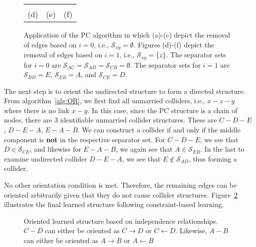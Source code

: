 \documentclass{article}
\begin{document}
\begin{figure}[H]
\begin{tabular}{@{}ccc@{}}
\begin{tikzpicture}[thick,scale=0.8, every node/.style={scale=0.8}]
        \end{tikzpicture}\\ 
        (d) & (e) & (f)
    \end{tabular}
    \caption{Application of the PC algorithm in which (a)-(c) depict the removal of edges based on $i = 0$, i.e., $\mathcal{S}_{xy} = \emptyset$. Figures (d)-(f) depict the removal of edges based on $i = 1$, i.e., $\mathcal{S}_{xy} = \{z\}$. The separator sets for $i = 0$ are $\mathcal{S}_{AC} = \mathcal{S}_{AD} = \mathcal{S}_{CB} = \emptyset$. The separator sets for $i = 1$ are $\mathcal{S}_{BD} = E$, $\mathcal{S}_{EB} = A$, and $\mathcal{S}_{CE} = D$. }
    \label{fig:PC}
\end{figure}

\noindent The next step is to orient the undirected structure to form a directed structure. From algorithm~\ref{alg:OR}, we first find all unmarried colliders, i.e., $x - z - y$ where there is no link $x - y$. In this case, since the PC structure is a chain of nodes, there are 3 identifiable unmarried collider structures. These are $C - D - E$, $D - E - A$, $E - A - B$. We can construct a collider if and only if the middle component is \textbf{not} in the respective separator set. For $C - D - E$, we see that $D \in \mathcal{S}_{CE}$, and likewise for $E - A - B$, we again see that $A \in \mathcal{S}_{EB}$. In the last to examine undirected collider $D - E - A$, we see that $E \notin \mathcal{S}_{AD}$, thus forming a collider. 

No other orientation condition is met. Therefore, the remaining edges can be oriented arbitrarily given that they do not cause collider structures. Figure~\ref{fig:PC2} illustrates the final learned structure following constraint-based learning. 

\begin{figure}[H]
    \centering
    \caption{Oriented learned structure based on independence relationships. $C - D$ can either be oriented as $C \rightarrow D$ or $C \leftarrow D$. Likewise, $A - B$ can either be oriented as $A \rightarrow B$ or $A \leftarrow B$}
    \label{fig:PC2}
\end{figure}
\end{document}
